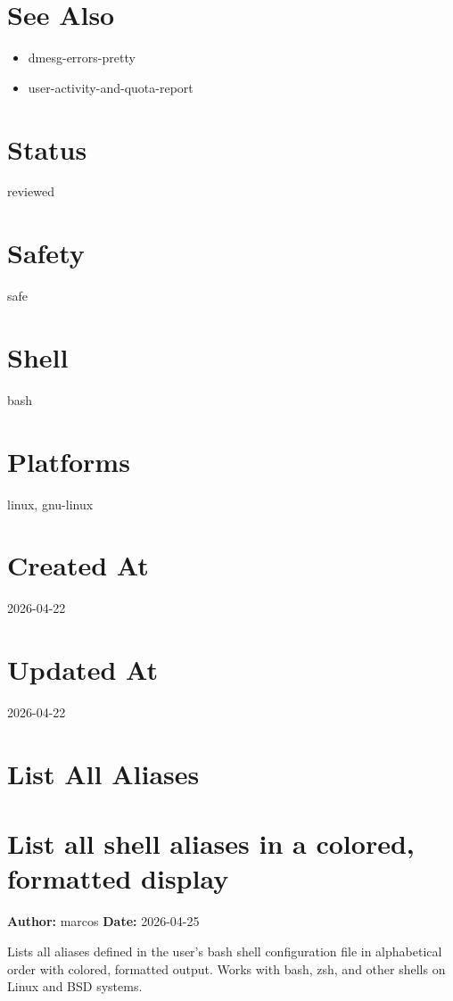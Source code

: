 \documentclass[openany]{book}
\begin{document}
\section*{See Also}
\begin{itemize}
  \item dmesg-errors-pretty
  \item user-activity-and-quota-report
\end{itemize}

\section*{Status}
reviewed

\section*{Safety}
safe

\section*{Shell}
bash

\section*{Platforms}
linux, gnu-linux

\section*{Created At}
2026-04-22

\section*{Updated At}
2026-04-22

\section{List All Aliases}
\section*{List all shell aliases in a colored, formatted display}
\textbf{Author:} marcos \hfill \textbf{Date:} 2026-04-25

\noindent Lists all aliases defined in the user's bash shell configuration file in alphabetical order with colored, formatted output. Works with bash, zsh, and other shells on Linux and BSD systems.
\end{document}
